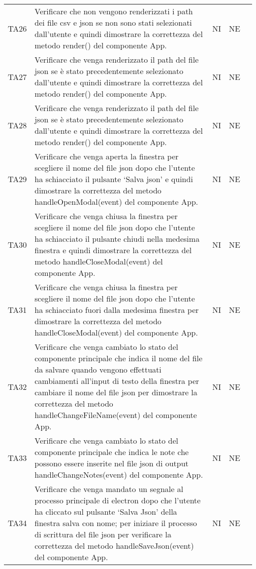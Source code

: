 \begin{longtable} {
		>{}p{15mm} 
		>{}p{79.5mm}
		>{}p{15mm} 
		>{}p{15mm}
		>{}p{0mm}}
	TA26	& Verificare che non vengono renderizzati i path dei file csv e json se non sono stati selezionati dall’utente e quindi dimostrare la correttezza del metodo render() del componente App. & NI & NE &\TBstrut \\ [2mm]
	TA27	& Verificare che venga renderizzato il path del file json se è stato precedentemente selezionato dall’utente e quindi dimostrare la correttezza del metodo render() del componente App. & NI & NE &\TBstrut \\ [2mm]
	TA28	& Verificare che venga renderizzato il path del file json se è stato precedentemente selezionato dall’utente e quindi dimostrare la correttezza del metodo render() del componente App. & NI & NE &\TBstrut \\ [2mm]
	TA29	& Verificare che venga aperta la finestra per scegliere il nome del file json dopo che l’utente ha schiacciato il pulsante ‘Salva json’ e quindi dimostrare la correttezza del metodo handleOpenModal(event) del componente App. & NI & NE &\TBstrut \\ [2mm]
	TA30	& Verificare che venga chiusa la finestra per scegliere il nome del file json dopo che l’utente ha schiacciato il pulsante chiudi nella medesima finestra e quindi dimostrare la correttezza del metodo handleCloseModal(event) del componente App. & NI & NE &\TBstrut \\ [2mm]
	TA31	& Verificare che venga chiusa la finestra per scegliere il nome del file json dopo che l’utente ha schiacciato fuori dalla medesima finestra per dimostrare la correttezza del metodo handleCloseModal(event) del componente App. & NI & NE &\TBstrut \\ [2mm]
	TA32	& Verificare che venga cambiato lo stato del componente principale che indica il nome del file da salvare quando vengono effettuati cambiamenti all'input di testo della finestra per cambiare il nome del file json per dimostrare la correttezza del metodo handleChangeFileName(event) del componente App. & NI & NE &\TBstrut \\ [2mm]
	TA33	& Verificare che venga cambiato lo stato del componente principale che indica le note che possono essere inserite nel file json di output handleChangeNotes(event) del componente App. & NI & NE &\TBstrut \\ [2mm]
	TA34	& Verificare che venga mandato un segnale al processo principale di electron dopo che l’utente ha cliccato sul pulsante ‘Salva Json’ della finestra salva con nome; per iniziare il processo di scrittura del file json per verificare la correttezza del metodo handleSaveJson(event) del componente App. & NI & NE &\TBstrut \\ [2mm]

\end{longtable}
